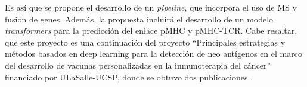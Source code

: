 \documentclass[a4paper,11pt]{article}
\begin{document}
Es así que se propone el desarrollo de un \textit{pipeline}, que incorpora el uso de MS y fusión de genes. Además, la propuesta incluirá el desarrollo de un modelo \textit{transformers} para la predicción del enlace pMHC y pMHC-TCR. Cabe resaltar, que este proyecto es una continuación del proyecto ``Principales estrategias y métodos basados en deep learning para la detección de neo antígenos en el marco del desarrollo de vacunas personalizadas en la inmunoterapia del cáncer'' financiado por ULaSalle-UCSP, donde se obtuvo dos publicaciones \citep{machaca2023deep,arceda2023neoantigen}. 






\end{document}
